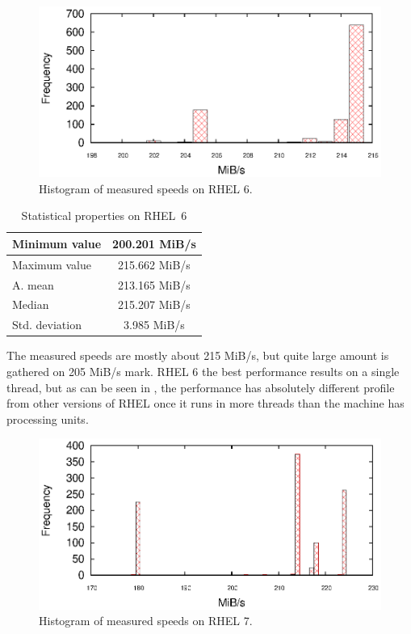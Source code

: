 \begin{figure}[h!]
  \centering
 \includegraphics[width=12cm]{fig/tests/scattering_rhel6.eps} %
\caption{Histogram of measured speeds on RHEL 6.}
\label{fig:testing:stability-r6}
\end{figure}

\begin{table}[h!]
\begin{center}
\begin{tabular}{|l|c|}
  \hline
  Minimum value& 200.201 MiB/s\\
  \hline
  Maximum value& 215.662 MiB/s\\ 
  \hline
  A. mean & 213.165 MiB/s\\
  \hline
  Median & 215.207 MiB/s\\
  \hline
  Std. deviation & 3.985 MiB/s \\
  \hline
\end{tabular}
\caption{Statistical properties on RHEL~6}
\label{tab:testing:stability-stat-r6}
\end{center}
\end{table}

\par{
The measured speeds are mostly about 215 MiB/s, but quite large amount is gathered on 205 MiB/s mark. RHEL 6 the best performance results on a single thread, but as can be seen in , the performance has absolutely different profile from other versions of RHEL once it runs in more threads than the machine has processing units.
}

\begin{figure}[h!]
  \centering
 \includegraphics[width=12cm]{fig/tests/scattering_rhel7.eps} %
\caption{Histogram of measured speeds on RHEL 7.}
\label{fig:testing:stability-r7}
\end{figure}

